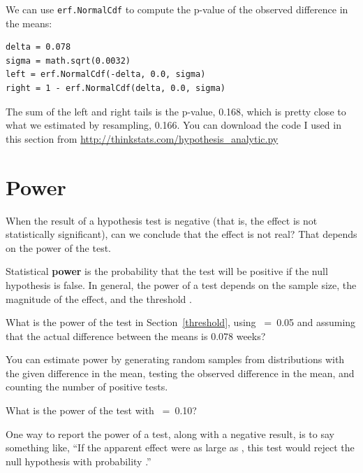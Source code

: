 \documentclass[12pt]{book}
\begin{document}
We can use {\tt erf.NormalCdf} to compute the p-value of the observed 
difference in the means:
%
\begin{verbatim}
delta = 0.078
sigma = math.sqrt(0.0032)
left = erf.NormalCdf(-delta, 0.0, sigma)
right = 1 - erf.NormalCdf(delta, 0.0, sigma)
\end{verbatim}

The sum of the left and right tails is the p-value, 0.168, which is
pretty close to what we estimated by resampling, 0.166. 
You can download the code I used in this section from
\url{http://thinkstats.com/hypothesis_analytic.py}


\section{Power}

When the result of a hypothesis test is negative (that is, the effect is
not statistically significant), can we conclude that the effect is not
real?  That depends on the power of the test.

Statistical {\bf power} is the probability that the test will be
positive if the null hypothesis is false.  In general, the power of a
test depends on the sample size, the magnitude of the effect, and the
threshold \myalpha.

\begin{exercise}
What is the power of the test in Section~\ref{threshold}, using
\myalpha~=~0.05 and assuming that the actual difference between the
means is 0.078 weeks?

You can estimate power by generating random samples from distributions
with the given difference in the mean, testing the observed difference
in the mean, and counting the number of positive tests.

What is the power of the test with \myalpha~=~0.10?

\end{exercise}

One way to report the power of a test, along with a negative result,
is to say something like, ``If the apparent effect were as large
as \x, this test would reject the null hypothesis with probability \p.''



\end{document}
